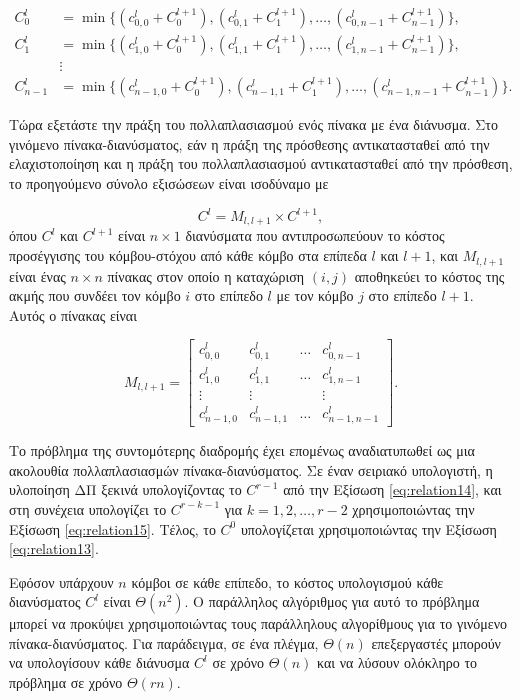 \documentclass[12pt,a4paper]{article}
\begin{document}
\begin{align*}
C_0^l &= \min \{ (c_{0,0}^l + C_0^{l+1}), (c_{0,1}^l + C_1^{l+1}), \dots, (c_{0,n-1}^l + C_{n-1}^{l+1}) \}, \\
C_1^l &= \min \{ (c_{1,0}^l + C_0^{l+1}), (c_{1,1}^l + C_1^{l+1}), \dots, (c_{1,n-1}^l + C_{n-1}^{l+1}) \}, \\
&\vdots \\
C_{n-1}^l &= \min \{ (c_{n-1,0}^l + C_0^{l+1}), (c_{n-1,1}^l + C_1^{l+1}), \dots, (c_{n-1,n-1}^l + C_{n-1}^{l+1}) \}.
\end{align*}

Τώρα εξετάστε την πράξη του πολλαπλασιασμού ενός πίνακα με ένα διάνυσμα. 
Στο γινόμενο πίνακα-διανύσματος, εάν η πράξη της πρόσθεσης αντικατασταθεί 
από την ελαχιστοποίηση και η πράξη του πολλαπλασιασμού αντικατασταθεί 
από την πρόσθεση, το προηγούμενο σύνολο εξισώσεων είναι ισοδύναμο με

\begin{equation}
C^l = M_{l,l+1} \times C^{l+1},
\label{eq:relation15}
\end{equation}
όπου $C^l$ και $C^{l+1}$ είναι $n \times 1$ διανύσματα που αντιπροσωπεύουν 
το κόστος προσέγγισης του κόμβου-στόχου από κάθε κόμβο στα επίπεδα $l$ 
και $l+1$, και $M_{l,l+1}$ είναι ένας $n \times n$ πίνακας στον οποίο η 
καταχώριση $(i, j)$ αποθηκεύει το κόστος της ακμής που συνδέει τον 
κόμβο $i$ στο επίπεδο $l$ με τον κόμβο $j$ στο επίπεδο $l+1$. Αυτός ο 
πίνακας είναι

$$
M_{l,l+1} = \begin{bmatrix}
c_{0,0}^l & c_{0,1}^l & \dots & c_{0,n-1}^l \\
c_{1,0}^l & c_{1,1}^l & \dots & c_{1,n-1}^l \\
\vdots & \vdots & & \vdots \\
c_{n-1,0}^l & c_{n-1,1}^l & \dots & c_{n-1,n-1}^l
\end{bmatrix}.
$$

Το πρόβλημα της συντομότερης διαδρομής έχει επομένως αναδιατυπωθεί ως 
μια ακολουθία πολλαπλασιασμών πίνακα-διανύσματος. Σε έναν σειριακό 
υπολογιστή, η υλοποίηση ΔΠ ξεκινά 
υπολογίζοντας το $C^{r-1}$ από την Εξίσωση \ref{eq:relation14}, και στη συνέχεια 
υπολογίζει το $C^{r-k-1}$ για $k = 1, 2, \dots, r - 2$ χρησιμοποιώντας 
την Εξίσωση \ref{eq:relation15}. Τέλος, το $C^0$ υπολογίζεται χρησιμοποιώντας την 
Εξίσωση \ref{eq:relation13}.

Εφόσον υπάρχουν $n$ κόμβοι σε κάθε επίπεδο, το κόστος υπολογισμού κάθε 
διανύσματος $C^l$ είναι $\Theta(n^2)$. Ο παράλληλος αλγόριθμος για αυτό 
το πρόβλημα μπορεί να προκύψει χρησιμοποιώντας τους παράλληλους 
αλγορίθμους για το γινόμενο πίνακα-διανύσματος. Για παράδειγμα, σε ένα πλέγμα, $\Theta(n)$ 
επεξεργαστές μπορούν να υπολογίσουν κάθε διάνυσμα $C^l$ σε χρόνο 
$\Theta(n)$ και να λύσουν ολόκληρο το πρόβλημα σε χρόνο $\Theta(rn)$.
\end{document}
